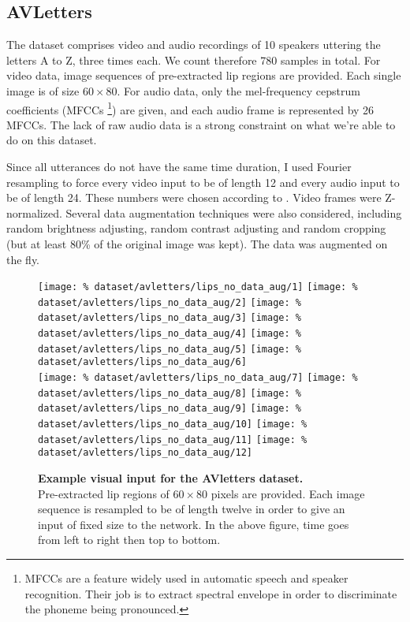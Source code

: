 \subsection{AVLetters}

The dataset comprises video and audio recordings of 10 speakers
uttering the letters A to Z, three times each.
We count therefore 780 samples in total. For video data, image sequences
of pre-extracted lip regions are provided.
Each single image is of size $60 \times 80$.
For audio data, only the mel-frequency cepstrum coefficients (MFCCs%
\footnote{MFCCs are a feature widely used in automatic speech and
speaker recognition. Their job is to extract spectral envelope
in order to discriminate the phoneme being pronounced.})
are given, and each audio frame is represented by 26 MFCCs.
The lack of raw audio data is a strong constraint on what we're able to do
on this dataset.

Since all utterances do not have the same time duration, I used
Fourier resampling to force every video input to be of length 12 and
every audio input to be of length 24. These numbers were chosen according
to \cite{S. Moon 2015}. Video frames were Z-normalized.
Several data augmentation techniques were also considered, including
random brightness adjusting, random contrast adjusting and random
cropping (but at least 80\% of the original image was kept).
The data was augmented on the fly.

\begin{figure}[H]
  \centering
  \texttt{[image: \%
    dataset/avletters/lips\_no\_data\_aug/1]}
  \texttt{[image: \%
    dataset/avletters/lips\_no\_data\_aug/2]}
  \texttt{[image: \%
    dataset/avletters/lips\_no\_data\_aug/3]}
  \texttt{[image: \%
    dataset/avletters/lips\_no\_data\_aug/4]}
  \texttt{[image: \%
    dataset/avletters/lips\_no\_data\_aug/5]}
  \texttt{[image: \%
    dataset/avletters/lips\_no\_data\_aug/6]}\\[0.15em]
  \texttt{[image: \%
    dataset/avletters/lips\_no\_data\_aug/7]}
  \texttt{[image: \%
    dataset/avletters/lips\_no\_data\_aug/8]}
  \texttt{[image: \%
    dataset/avletters/lips\_no\_data\_aug/9]}
  \texttt{[image: \%
    dataset/avletters/lips\_no\_data\_aug/10]}
  \texttt{[image: \%
    dataset/avletters/lips\_no\_data\_aug/11]}
  \texttt{[image: \%
    dataset/avletters/lips\_no\_data\_aug/12]}
  \caption{%
    \textbf{Example visual input for the AVletters dataset.}\\[0.1em]
    Pre-extracted lip regions of $60 \times 80$ pixels are provided.
      Each image sequence is resampled to be of length twelve in order to
      give an input of fixed size to the network. In the above figure,
      time goes from left to right then top to bottom.}
  \label{fig:avletters_exs}
\end{figure}

